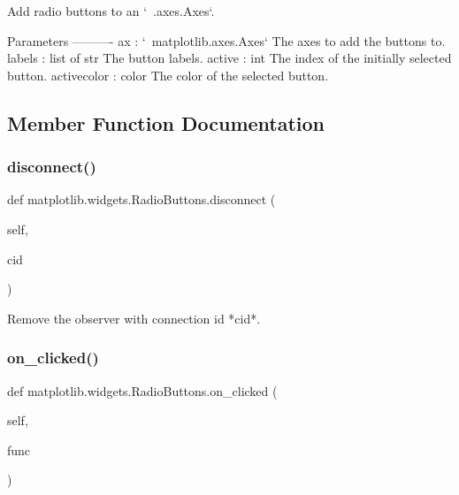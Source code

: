 \begin{DoxyVerb}Add radio buttons to an `~.axes.Axes`.

Parameters
----------
ax : `~matplotlib.axes.Axes`
    The axes to add the buttons to.
labels : list of str
    The button labels.
active : int
    The index of the initially selected button.
activecolor : color
    The color of the selected button.
\end{DoxyVerb}
 

\subsection{Member Function Documentation}
\mbox{\label{classmatplotlib_1_1widgets_1_1RadioButtons_a7f96c03e9756e7c4098c2fcb1ef5175d}} 
\subsubsection{\texorpdfstring{disconnect()}{disconnect()}}
{\footnotesize\ttfamily def matplotlib.\+widgets.\+Radio\+Buttons.\+disconnect (\begin{DoxyParamCaption}\item[{}]{self,  }\item[{}]{cid }\end{DoxyParamCaption})}

\begin{DoxyVerb}Remove the observer with connection id *cid*.\end{DoxyVerb}
 \mbox{\label{classmatplotlib_1_1widgets_1_1RadioButtons_ad0aaa373d0a5f717bc4bddac898afae6}} 
\subsubsection{\texorpdfstring{on\+\_\+clicked()}{on\_clicked()}}
{\footnotesize\ttfamily def matplotlib.\+widgets.\+Radio\+Buttons.\+on\+\_\+clicked (\begin{DoxyParamCaption}\item[{}]{self,  }\item[{}]{func }\end{DoxyParamCaption})}

